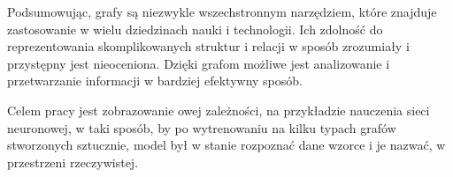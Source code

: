 Podsumowując, grafy są niezwykle wszechstronnym narzędziem, które znajduje zastosowanie w wielu dziedzinach nauki i technologii.
Ich zdolność do reprezentowania skomplikowanych struktur i relacji w sposób zrozumiały i przystępny jest nieoceniona.
Dzięki grafom możliwe jest analizowanie i przetwarzanie informacji w bardziej efektywny sposób. 

Celem pracy jest zobrazowanie owej zależności, na przykładzie nauczenia sieci neuronowej,
w taki sposób, by po wytrenowaniu na kilku typach grafów stworzonych sztucznie,
model był w stanie rozpoznać dane wzorce i je nazwać, w przestrzeni rzeczywistej.